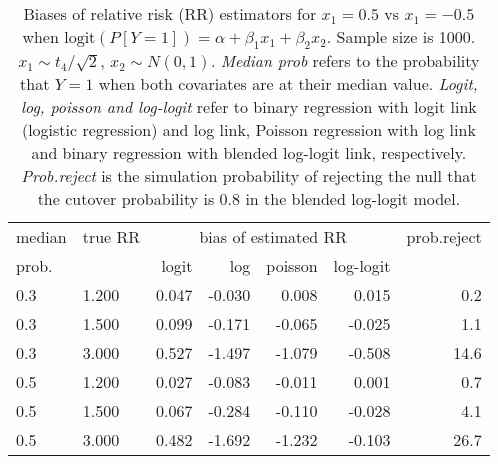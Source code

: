 \documentclass[12pt,a4paper]{article}
\begin{document}
\begin{table}[H] 
\small\sf\centering 
\caption{Biases of relative risk (RR) estimators for $x_1=0.5$ vs $x_1=-0.5$ when $\mbox{logit}(P[Y=1])=\alpha+\beta_1 x_1 + \beta_2 x_2$. Sample size is 1000. $x_1 \sim $$t_4/\sqrt{2}$, $x_2 \sim N(0,1)$. {\it Median prob} refers to the probability that $Y=1$ when both covariates are at their median value. {\it Logit, log, poisson and log-logit} refer to binary regression with logit link (logistic regression) and log link, Poisson regression with log link and binary regression with blended log-logit link, respectively. {\it Prob.reject} is the simulation probability of rejecting the null that the cutover probability is $0.8$ in the blended log-logit model.} 
\begin{tabular}{llrrrrr} 
\toprule 
median & true RR & \multicolumn{4}{c}{bias of estimated RR} & prob.reject \\ 
prob. & & logit & log & poisson & log-logit  & \\ \midrule 
0.3 & 1.200 & 0.047 & -0.030 &  0.008 &  0.015 &  0.2 \\  
0.3 & 1.500 & 0.099 & -0.171 & -0.065 & -0.025 &  1.1 \\  
0.3 & 3.000 & 0.527 & -1.497 & -1.079 & -0.508 & 14.6 \\  
0.5 & 1.200 & 0.027 & -0.083 & -0.011 &  0.001 &  0.7 \\  
0.5 & 1.500 & 0.067 & -0.284 & -0.110 & -0.028 &  4.1 \\  
0.5 & 3.000 & 0.482 & -1.692 & -1.232 & -0.103 & 26.7 \\  
\bottomrule 
\end{tabular} 
\end{table} 
\end{document}
